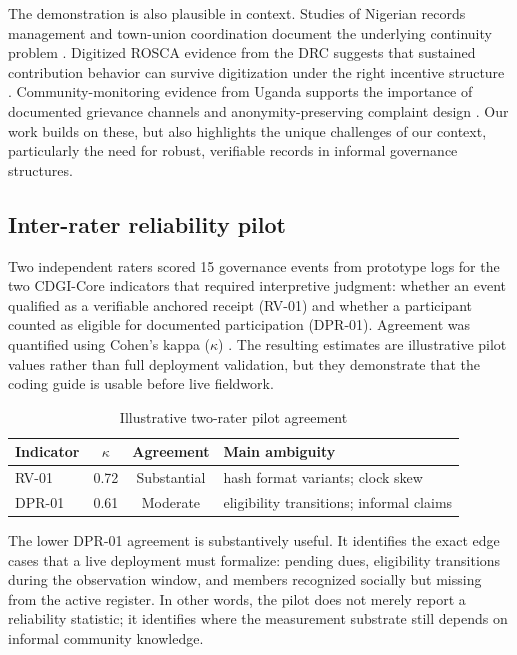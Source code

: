 \documentclass[sigconf]{acmart}
\begin{document}
The demonstration is also plausible in context. Studies of Nigerian records management and town-union coordination document the underlying continuity problem \cite{abioye2007, honey1998}. Digitized ROSCA evidence from the DRC suggests that sustained contribution behavior can survive digitization under the right incentive structure \cite{chioda2021}. Community-monitoring evidence from Uganda supports the importance of documented grievance channels and anonymity-preserving complaint design \cite{bjorkman2009}. Our work builds on these, but also highlights the unique challenges of our context, particularly the need for robust, verifiable records in informal governance structures.

\subsection{Inter-rater reliability pilot}

Two independent raters scored 15 governance events from prototype logs for the two CDGI-Core indicators that required interpretive judgment: whether an event qualified as a verifiable anchored receipt (RV-01) and whether a participant counted as eligible for documented participation (DPR-01). Agreement was quantified using Cohen's kappa ($\kappa$) \cite{cohen1960}. The resulting estimates are illustrative pilot values rather than full deployment validation, but they demonstrate that the coding guide is usable before live fieldwork.

\begin{table}[t]
\caption{Illustrative two-rater pilot agreement}
\label{tab:kappa}
\small
\begin{tabularx}{\columnwidth}{l c c X}
\toprule
Indicator & $\kappa$ & Agreement & Main ambiguity \\
\midrule
RV-01 & 0.72 & Substantial & hash format variants; clock skew \\
DPR-01 & 0.61 & Moderate & eligibility transitions; informal claims \\
\bottomrule
\end{tabularx}
\end{table}

The lower DPR-01 agreement is substantively useful. It identifies the exact edge cases that a live deployment must formalize: pending dues, eligibility transitions during the observation window, and members recognized socially but missing from the active register. In other words, the pilot does not merely report a reliability statistic; it identifies where the measurement substrate still depends on informal community knowledge.
\end{document}
